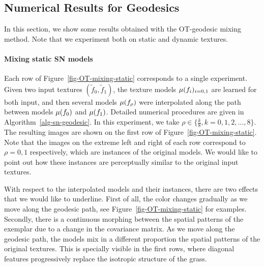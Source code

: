 \subsection{Numerical Results for Geodesics}

In this section, we show some results obtained with the OT-geodesic mixing method.
Note that we experiment both on static and dynamic textures.

\paragraph{Mixing static SN models}

Each row of Figure~\ref{fig-OT-mixing-static} corresponds to a single experiment. Given two input textures $(\tilde f_0,\tilde f_1)$, the texture models $\mu(f_i)_{i=0,1}$ are learned for both input, and then several models $\mu(f_{\rho})$ were interpolated along the path between models $\mu(f_0)$ and $\mu(f_1)$.
Detailed numerical procedures are given in Algorithm~\ref{alg-sn-geodesic}.
In this experiment, we take $ \rho \in  \{ \frac{k}{8}, k=0, 1,2,\ldots,8\}$. The resulting images are shown on the first row of Figure~\ref{fig-OT-mixing-static}. Note that the images on the extreme left and right of each row correspond to $ \rho=0,1$ respectively, which are instances of the original models. We would like to point out how these instances are perceptually similar to the original input textures.

With respect to the interpolated models and their instances, there are two effects that we would like to underline. First of all, the color changes gradually as we move along the geodesic path, see Figure~\ref{fig-OT-mixing-static} for examples. Secondly, there is a continuous morphing between the spatial patterns of the exemplar due to a change in the covariance matrix. As we move along the geodesic path, the models mix in a different proportion the spatial patterns of the original textures.  This is specially visible in the first rows, where diagonal features progressively replace the isotropic structure of the grass.

